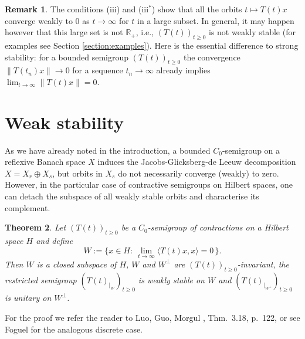 \documentclass[11pt,intlimits, draft,oneside]{amsart}
\newtheorem{thm}{Theorem}[section]
\theoremstyle{definition}
\newtheorem{remark}[thm]{Remark}
\begin{document}
\begin{remark}
The conditions (iii) and (iii$^*$) show that all the orbits
$t\mapsto T(t)x$ converge weakly to $0$ as $t\rightarrow\infty$ for
$t$ in a large subset. 
In general, it may happen however
that this large set is not $\mathbb{R}_+$, i.e., $(T(t))_{t\geq 0}$
is not weakly stable (for examples see Section
\ref{section:examples}). Here is the essential difference to strong
stability: for a bounded semigroup $(T(t))_{t\geq 0}$ the
convergence $\|T(t_n)x\|\rightarrow 0$ for a sequence
$t_n\rightarrow \infty$ already implies $\displaystyle
\lim_{t\rightarrow\infty} \|T(t)x\| = 0$.
\end{remark}


\section{Weak stability} \label{section:weak_stability}

As we have already noted in the introduction, a bounded
$C_0$-semigroup on a reflexive Banach space $X$ induces the
Jacobs-Glicksberg-de Leeuw decomposition $X=X_r \oplus X_s$, but
orbits in $X_s$ do not necessarily converge (weakly) to zero.
However, in the particular case of contractive semigroups on Hilbert
spaces, one can detach the subspace of all weakly stable orbits and
characterise its complement.


\begin{thm}
Let $(T(t))_{t\geq0}$ be a $C_0$-semigroup of contractions on a
Hilbert space $H$ and define
%
\begin{equation*}W:=\bigl\{ x \in H: \ \lim_{t\to\infty} \langle T(t)x,x \rangle = 0 \, \bigr\} .\end{equation*}
%
Then $W$ is a closed subspace of $H$, $W$ and $W^{\perp}$ are
$(T(t))_{t\geq 0}$-invariant, the restricted semigroup
$(T(t)_{\mid_W})_{t\geq 0}$ is weakly stable on $W$ and
$(T(t)_{\mid_{W^{\perp}}})_{t\geq 0}$ is unitary on $W^{\perp}$.
\end{thm}

\noindent For the proof we refer the reader to Luo, Guo, Morgul
\cite{luo/gou/morgul:1999}, Thm.~3.18, p.~122, or see Foguel
\cite{foguel:1963} for the analogous discrete case.
\end{document}
